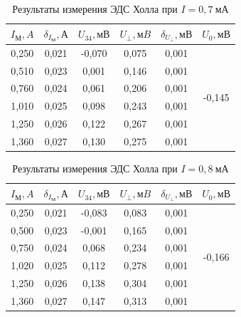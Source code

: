 \documentclass[a4paper, 12pt]{article}
\begin{document}
\begin{table}[h!]
\begin{center}
\begin{tabular}{|c|c|c|c|c|c|}
\hline
$I_М, A$  & $\delta_{I_М}, А$ & $U_{34}, мВ$ & $U_{\perp}, мB$ & $\delta_{U_{\perp}}, мВ$ & $U_0, мВ$                     \\ \hline
0,250 & 0,021 & -0,070  & 0,075    & 0,001  & \multirow{6}{*}{-0,145} \\ \cline{1-5}
0,510 & 0,023 & 0,001   & 0,146    & 0,001  &                         \\ \cline{1-5}
0,760 & 0,024 & 0,061   & 0,206    & 0,001  &                         \\ \cline{1-5}
1,010 & 0,025 & 0,098   & 0,243    & 0,001  &                         \\ \cline{1-5}
1,250 & 0,026 & 0,122   & 0,267    & 0,001  &                         \\ \cline{1-5}
1,360 & 0,027 & 0,130   & 0,275    & 0,001  &                         \\ \hline
\end{tabular}
\end{center}
\caption{Результаты измерения ЭДС Холла при $I = 0,7~мА$}
\label{tab6}
\end{table}

\begin{table}[h!]
\begin{center}
\begin{tabular}{|c|c|c|c|c|c|}
\hline
$I_М, A$  & $\delta_{I_М}, А$ & $U_{34}, мВ$ & $U_{\perp}, мB$ & $\delta_{U_{\perp}}, мВ$ & $U_0, мВ$                     \\ \hline
0,250 & 0,021 & -0,083  & 0,083    & 0,001  & \multirow{6}{*}{-0,166} \\ \cline{1-5}
0,500 & 0,023 & -0,001  & 0,165    & 0,001  &                         \\ \cline{1-5}
0,750 & 0,024 & 0,068   & 0,234    & 0,001  &                         \\ \cline{1-5}
1,020 & 0,025 & 0,112   & 0,278    & 0,001  &                         \\ \cline{1-5}
1,250 & 0,026 & 0,138   & 0,304    & 0,001  &                         \\ \cline{1-5}
1,360 & 0,027 & 0,147   & 0,313    & 0,001  &                         \\ \hline
\end{tabular}
\end{center}
\caption{Результаты измерения ЭДС Холла при $I = 0,8~мА$}
\label{tab7}
\end{table}
\end{document}
